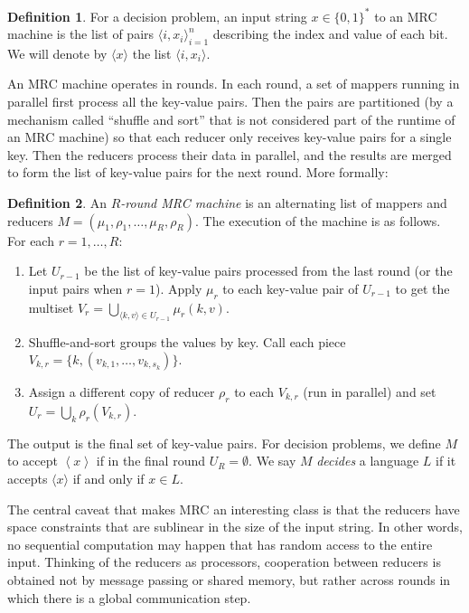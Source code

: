\documentclass[letterpaper,USenglish]{lipics}
\theoremstyle{definition}
\newtheorem{defn}{Definition}
\theoremstyle{remark}
\begin{document}
\begin{defn}
For a decision problem, an input string $x \in \{ 0,1 \}^*$ to an MRC machine
is the list of pairs $\langle i, x_i \rangle_{i=1}^n$ describing the index
and value of each bit. We will denote by $\langle x \rangle$ the list $\langle
i, x_i \rangle$.
\end{defn}

An MRC machine operates in rounds. In each round, a set of mappers running in
parallel first process all the key-value pairs. Then the pairs are partitioned
(by a mechanism called ``shuffle and sort'' that is not considered part of the
runtime of an MRC machine) so that each reducer only receives key-value pairs
for a single key. Then the reducers process their data in
parallel, and the results are merged to form the list of key-value pairs for
the next round. More formally:

\begin{defn}
An \emph{$R$-round MRC machine} is an alternating list of mappers and reducers
$M = (\mu_1, \rho_1, \dots, \mu_R, \rho_R)$. The execution of the machine is as
follows.
For each $r = 1, \dots, R$:
\begin{enumerate}
  \item Let $U_{r-1}$ be the list of key-value pairs processed from the last
round (or the input pairs when $r=1$). Apply $\mu_r$ to each key-value pair of
$U_{r-1}$ to get the multiset $V_r = \bigcup_{\langle k,v \rangle \in U_{r-1}}
\mu_r(k, v).$

  \item Shuffle-and-sort groups the values by key. Call each piece $V_{k,r} =
\{ k, (v_{k,1}, \dots, v_{k,s_k})\}.$

  \item Assign a different copy of reducer $\rho_r$ to each $V_{k,r}$ (run in
parallel) and set $U_r = \bigcup_{k}\rho_r(V_{k,r})$.
\end{enumerate}
\end{defn}

The output is the final set of key-value pairs. For decision problems, we
define $M$ to accept $\left \langle x \right \rangle$ if in the final round
$U_R = \emptyset$. We say $M$ \emph{decides} a language $L$ if it accepts
$\langle x \rangle$ if and only if $x \in L$.

The central caveat that makes MRC an interesting class is that the reducers
have space constraints that are sublinear in the size of the input string. In
other words, no sequential computation may happen that has random access to the
entire input. Thinking of the reducers as processors, cooperation between
reducers is obtained not by message passing or shared memory, but rather across
rounds in which there is a global communication step.
\end{document}
